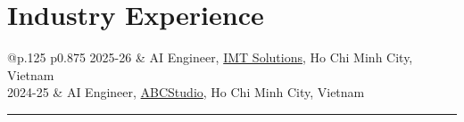 
\section*{Industry Experience}
\label{exp_industry}
\begin{longtable}[l]{@{}p{.125\textwidth} p{0.875\textwidth}}
  2025-26 & AI Engineer, \href{https://imt-soft.com/}{IMT Solutions}, Ho Chi Minh City, Vietnam \\
  2024-25 & AI Engineer, \href{https://abcstudio.co/}{ABCStudio}, Ho Chi Minh City, Vietnam \\
\end{longtable}

\centering
\rule{0.25\linewidth}{0.4pt}\\



